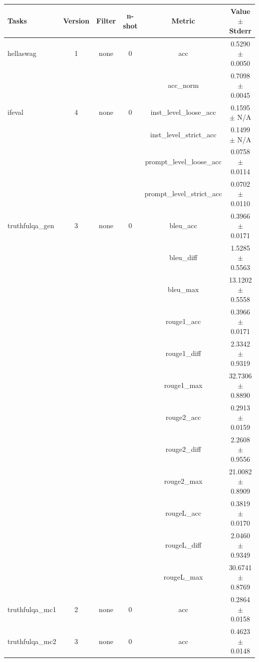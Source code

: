 \documentclass{ifacconf}
\begin{document}
\begin{strip}
\begin{minipage}{\textwidth}
    \begin{table}[H]
    \centering
    \begin{tabular}{|l|c|c|c|c|c|}
    \hline
    \textbf{Tasks} & \textbf{Version} & \textbf{Filter} & \textbf{n-shot} & \textbf{Metric} & \textbf{Value} $\pm$ \textbf{Stderr} \\ \hline
    hellaswag & 1 & none & 0 & acc & 0.5290 $\pm$ 0.0050 \\ \hline
    & & & & acc\_norm & 0.7098 $\pm$ 0.0045 \\ \hline
    ifeval & 4 & none & 0 & inst\_level\_loose\_acc & 0.1595 $\pm$ N/A \\ \hline
    & & & & inst\_level\_strict\_acc & 0.1499 $\pm$ N/A \\ \hline
    & & & & prompt\_level\_loose\_acc & 0.0758 $\pm$ 0.0114 \\ \hline
    & & & & prompt\_level\_strict\_acc & 0.0702 $\pm$ 0.0110 \\ \hline
    truthfulqa\_gen & 3 & none & 0 & bleu\_acc & 0.3966 $\pm$ 0.0171 \\ \hline
    & & & & bleu\_diff & 1.5285 $\pm$ 0.5563 \\ \hline
    & & & & bleu\_max & 13.1202 $\pm$ 0.5558 \\ \hline
    & & & & rouge1\_acc & 0.3966 $\pm$ 0.0171 \\ \hline
    & & & & rouge1\_diff & 2.3342 $\pm$ 0.9319 \\ \hline
    & & & & rouge1\_max & 32.7306 $\pm$ 0.8890 \\ \hline
    & & & & rouge2\_acc & 0.2913 $\pm$ 0.0159 \\ \hline
    & & & & rouge2\_diff & 2.2608 $\pm$ 0.9556 \\ \hline
    & & & & rouge2\_max & 21.0082 $\pm$ 0.8909 \\ \hline
    & & & & rougeL\_acc & 0.3819 $\pm$ 0.0170 \\ \hline
    & & & & rougeL\_diff & 2.0460 $\pm$ 0.9349 \\ \hline
    & & & & rougeL\_max & 30.6741 $\pm$ 0.8769 \\ \hline
    truthfulqa\_mc1 & 2 & none & 0 & acc & 0.2864 $\pm$ 0.0158 \\ \hline
    truthfulqa\_mc2 & 3 & none & 0 & acc & 0.4623 $\pm$ 0.0148 \\ \hline
    \end{tabular}
    \label{tab:llama31_q6k}
    \end{table}
\end{minipage}
\end{strip}
\end{document}
